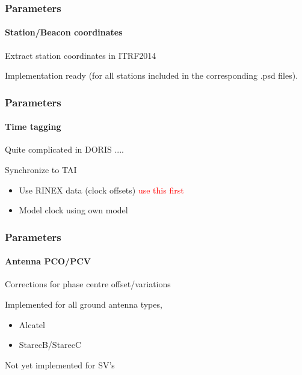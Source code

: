 \documentclass{beamer}
\begin{document}
%    
%    
%

\begin{frame}\frametitle{Parameters}\framesubtitle{Station/Beacon coordinates}
    Extract station coordinates in ITRF2014\\
    \vspace{.3cm}

    Implementation ready (for all stations included in the corresponding .psd files).\\
    \vspace{.3cm}

\end{frame}

\begin{frame}\frametitle{Parameters}\framesubtitle{Time tagging}
    Quite complicated in DORIS ....
    \vspace{.3cm}

    Synchronize to TAI\\
    \vspace{.3cm}

  \begin{itemize}
      \item Use RINEX data (clock offsets) \textcolor{red}{use this first}
      \item Model clock using own model
  \end{itemize}
    \vspace{.3cm}

\end{frame}

\begin{frame}\frametitle{Parameters}\framesubtitle{Antenna PCO/PCV}
    Corrections for phase centre offset/variations\\
    \vspace{.3cm}

  Implemented for all ground antenna types,
  \begin{itemize}
      \item Alcatel
      \item StarecB/StarecC
  \end{itemize}
  \vspace{.3cm}

  Not yet implemented for SV's
  \vspace{.3cm}

\end{frame}


\end{document}
